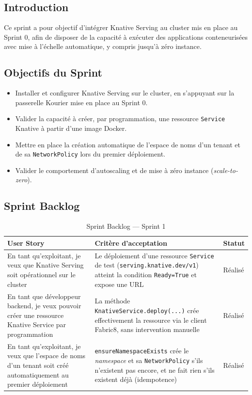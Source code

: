 \subsection{Introduction}

Ce sprint a pour objectif d'intégrer Knative Serving au cluster mis en place au Sprint 0, afin de disposer de la capacité à exécuter des applications conteneurisées avec mise à l'échelle automatique, y compris jusqu'à zéro instance.

\subsection{Objectifs du Sprint}

\begin{itemize}
    \item Installer et configurer Knative Serving sur le cluster, en s'appuyant sur la passerelle Kourier mise en place au Sprint 0.
    \item Valider la capacité à créer, par programmation, une ressource \texttt{Service} Knative à partir d'une image Docker.
    \item Mettre en place la création automatique de l'espace de noms d'un tenant et de sa \texttt{NetworkPolicy} lors du premier déploiement.
    \item Valider le comportement d'autoscaling et de mise à zéro instance (\textit{scale-to-zero}).
\end{itemize}

\subsection{Sprint Backlog}

\begin{table}[!ht]
\begin{center}
     \begin{tabular}{|l{6cm}|l{5.5cm}|l{2.5cm}|}
     \hline
     \textbf{User Story} & \textbf{Critère d'acceptation} & \textbf{Statut} \\
     \hline
     En tant qu'exploitant, je veux que Knative Serving soit opérationnel sur le cluster & Le déploiement d'une ressource \texttt{Service} de test (\texttt{serving.knative.dev/v1}) atteint la condition \texttt{Ready=True} et expose une URL & Réalisé \\
     \hline
     En tant que développeur backend, je veux pouvoir créer une ressource Knative Service par programmation & La méthode \texttt{KnativeService.deploy(...)} crée effectivement la ressource via le client Fabric8, sans intervention manuelle & Réalisé \\
     \hline
     En tant qu'exploitant, je veux que l'espace de noms d'un tenant soit créé automatiquement au premier déploiement & \texttt{ensureNamespaceExists} crée le \textit{namespace} et sa \texttt{NetworkPolicy} s'ils n'existent pas encore, et ne fait rien s'ils existent déjà (idempotence) & Réalisé \\
     \hline
     \end{tabular}
     \caption{Sprint Backlog — Sprint 1}
     \label{tab:sb-sprint1}
     \end{center}
\end{table}

